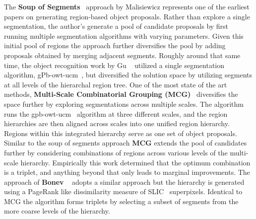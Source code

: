 The {\bf Soup of Segments}~\cite{Malisiewicz:Efros:BMVC07} approach by Malisiewicz \etal represents one of the earliest papers on generating region-based object proposals. Rather than explore a single segmentation, the author's generate a pool of candidate proposals by first running multiple segmentation algorithms with varying parameters. Given this initial pool of regions the approach further diversifies the pool by adding proposals obtained by merging adjacent segments. Roughly around that same time, the object recognition work by Gu \etal~\cite{Gu:etal:CVPR09} utilized a single segmentation algorithm, gPb-owt-ucm~\cite{Arbelaez:etal:PAMI11}, but diversified the solution space by utilizing segments at all levels of the hierarchal region tree. One of the most state of the art methods, {\bf Multi-Scale Combinatorial Grouping (MCG)}~\cite{Arbelaez:etal:CVPR14} diversifies the space further by exploring segmentations across multiple scales. The algorithm runs the gpb-owt-ucm~\cite{Arbelaez:etal:PAMI11} algorithm at three different scales, and the region hierarchies are then aligned across scales into one unified region hierarchy. Regions within this integrated hierarchy serve as one set of object proposals. Similar to the soup of segments approach {\bf MCG} extends the pool of candidates further by considering combinations of regions across various levels of the multi-scale hierarchy. Empirically this work determined that the optimum combination is a triplet, and anything beyond that only leads to marginal improvements. The approach of {\bf Bonev} \etal~\cite{Bonev:Yuille:ECCV14} adopts a similar approach but the hierarchy is generated using a PageRank like dissimilarity measure of SLIC~\cite{Achanta:etal:PAMI12} superpixels. Identical to MCG the algorithm forms triplets by selecting a subset of segments from the more coarse levels of the hierarchy.



